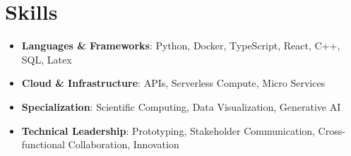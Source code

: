 \documentclass[]{friggeri-cv}
\begin{document}
\vspace{18pt}
\section{Skills}
\begin{itemize} 
	\item {\large\textbf{\textcolor{pblue}{Languages \& Frameworks}}}: Python, Docker, TypeScript, React, C++, SQL, Latex
	\item {\large\textbf{\textcolor{pblue}{Cloud \& Infrastructure}}}: APIs, Serverless Compute, Micro Services
	\item {\large\textbf{\textcolor{pblue}{Specialization}}}: Scientific Computing, Data Visualization, Generative AI
	\item {\large\textbf{\textcolor{pblue}{Technical Leadership}}}: Prototyping, Stakeholder Communication, Cross-functional Collaboration, Innovation
\end{itemize}
\vspace{1em}
\end{document}
